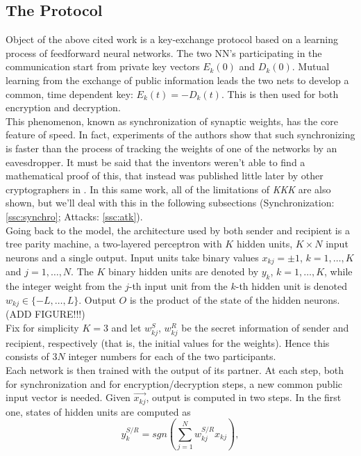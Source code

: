 \documentclass[%
    corpo=11pt,
    twoside,
    stile=classica,
    oldstyle,
    autoretitolo,
    tipotesi=magistrale,
    greek,
    evenboxes,
    english
]{toptesi}
\begin{document}
\subsection{The Protocol}
Object of the above cited work is a key-exchange protocol based on a learning process of feedforward neural networks. The two NN's participating in the communication start from private key vectors $E_k(0)$ and $D_k(0)$. Mutual learning from the exchange of public information leads the two nets to develop a common, time dependent key: $E_k(t) = - D_k(t)$. This is then used for both encryption and decryption. \\
This phenomenon, known as synchronization of synaptic weights, has the core feature of speed. In fact, experiments of the authors show that such synchronizing is faster than the process of tracking the weights of one of the networks by an eavesdropper. It must be said that the inventors weren't able to find a mathematical proof of this, that instead was published little later by other cryptographers in \cite{shamir}. In this same work, all of the limitations of \textit{KKK} are also shown, but we'll deal with this in the following subsections (Synchronization: \ref{ssc:synchro}; Attacks: \ref{ssc:atk}).  \\
Going back to the model, the architecture used by both sender and recipient is a tree parity machine, a two-layered perceptron with $K$ hidden units, $K \times N$ input neurons and a single output. Input units take binary values $x_{kj} = \pm 1$, $k = 1,\dots, K$ and $j = 1, \dots, N$. The $K$ binary hidden units are denoted by $y_k$, $k = 1,\dots, K$, while the integer weight from the $j$-th input unit from the $k$-th hidden unit is denoted $w_{kj}\in\{-L,\dots,L\}$. Output $O$ is the product of the state of the hidden neurons. (ADD FIGURE!!!) \\
Fix for simplicity $K = 3$ and let $w_{kj}^S$, $w_{kj}^R$ be the secret information of sender and recipient, respectively (that is, the initial values for the weights). Hence this consists of $3N$ integer numbers for each of the two participants. \\
Each network is then trained with the output of its partner. At each step, both for synchronization and for encryption/decryption steps, a new common public input vector is needed. Given $\vec{x_{kj}}$, output is computed in two steps. In the first one, states of hidden units are computed as 
\begin{equation}
y_k^{S/R} = sgn\left(\sum_{j=1}^{N}w_{kj}^{S/R}x_{kj}\right),
\end{equation}
\end{document}

